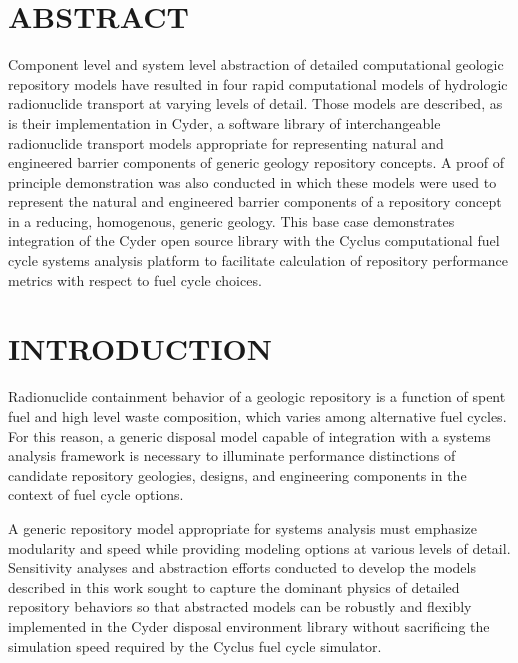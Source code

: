 \documentclass[letterpaper, 11pt]{article}
\begin{document}
\section*{ABSTRACT}

Component level and system level abstraction of detailed computational geologic 
repository models have resulted in four rapid computational models of hydrologic 
radionuclide transport at varying levels of detail. Those models are described, 
as is their implementation in Cyder, a software library of 
interchangeable radionuclide transport models appropriate for representing 
natural and engineered barrier components of generic geology repository 
concepts. A proof of principle demonstration was also conducted in which these models 
were used to represent the natural and engineered barrier components of a 
repository concept in a reducing, homogenous, generic geology. 
This base case demonstrates integration of the Cyder open source library with the Cyclus 
computational fuel cycle systems analysis platform to facilitate calculation of
repository performance metrics with respect to fuel cycle choices.

\section*{INTRODUCTION}
Radionuclide containment behavior of a geologic repository is a function 
of spent fuel and high level waste composition, which varies among alternative fuel cycles. For this 
reason, a generic disposal model capable of integration with a systems analysis 
framework is necessary to illuminate performance distinctions of candidate 
repository geologies, designs, and engineering components in the context of fuel 
cycle options. 

A generic repository model appropriate for systems analysis must emphasize 
modularity and speed while providing modeling options at various levels of 
detail. Sensitivity analyses and abstraction efforts conducted to develop the 
models described in this work sought to capture the dominant physics of detailed 
repository behaviors so that abstracted models can be robustly and flexibly 
implemented in the Cyder disposal environment library without sacrificing the 
simulation speed required by the Cyclus fuel cycle simulator.
\end{document}
